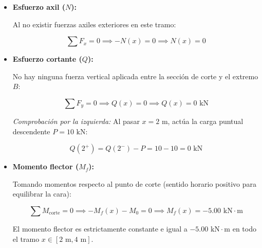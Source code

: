 \begin{itemize}

    \item \textbf{Esfuerzo axil ($N$):}

          Al no existir fuerzas axiles exteriores en este tramo:

          \begin{equation}

              \sum F_x = 0 \implies -N(x) = 0 \implies \boxed{N(x) = 0}

          \end{equation}



    \item \textbf{Esfuerzo cortante ($Q$):}

          No hay ninguna fuerza vertical aplicada entre la sección de corte y el extremo $B$:

          \begin{equation}

              \sum F_y = 0 \implies Q(x) = 0 \implies \boxed{Q(x) = 0\text{ kN}}

          \end{equation}

          \textit{Comprobación por la izquierda:} Al pasar $x = 2\text{ m}$, actúa la carga puntual descendente $P = 10\text{ kN}$:

          \[

              Q(2^+) = Q(2^-) - P = 10 - 10 = 0\text{ kN}

          \]



    \item \textbf{Momento flector ($M_f$):}

          Tomando momentos respecto al punto de corte (sentido horario positivo para equilibrar la cara):

          \begin{equation}

              \sum M_{\text{corte}} = 0 \implies -M_f(x) - M_0 = 0 \implies \boxed{M_f(x) = -5.00\text{ kN}\cdot\text{m}}

          \end{equation}

          El momento flector es estrictamente constante e igual a $-5.00\text{ kN}\cdot\text{m}$ en todo el tramo $x \in [2\text{ m}, 4\text{ m}]$.

\end{itemize}





